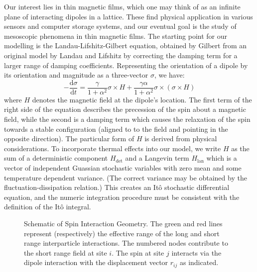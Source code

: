 \documentclass{article}
\newcommand{\deriv}[2]{\frac{\mathrm{d}#1}{\mathrm{d}#2}}
\theoremstyle{definition}
\begin{document}
Our interest lies in thin magnetic films, which one may think of as an infinite
plane of interacting dipoles in a lattice. These find physical application in
various sensors and computer storage systems, and our eventual goal is the study
of mesoscopic phenomena in thin magnetic films. The starting point for our
modelling is the Landau-Lifshitz-Gilbert equation, obtained by Gilbert from an
original model by Landau and Lifshitz by correcting the damping term for a
larger range of damping coefficients\cite{gilbertLLG}. Representing the
orientation of a dipole by its orientation and magnitude as a three-vector
$\sigma$, we have:
\begin{equation}\label{eqn:LLG}
  -\deriv{\sigma}{t} = \frac{\gamma}{1 + \alpha^2} \sigma \times H +
\frac{\gamma \alpha}{1 + \alpha^2} \sigma \times (\sigma \times H)
\end{equation}
where $H$ denotes the magnetic field at the dipole's location. The first term of
the right side of the equation describes the precession of the spin about a
magnetic field, while the second is a damping term which causes the relaxation
of the spin towards a stable configuration (aligned to to the field and pointing
in the opposite direction). The particular form of $H$ is derived from physical
considerations. To incorporate thermal effects into our model, we write $H$ as
the sum of a deterministic component $H_\text{det}$ and a Langevin term
$H_\text{lan}$ which is a vector of independent Guassian stochastic variables
with zero mean and some temperature dependent variance. (The correct variance may be
obtained by the fluctuation-dissipation relation.) This creates an Itô
stochastic differential equation, and the numeric integration procedure must be
consistent with the definition of the Itô integral.

\begin{figure}
\caption{\label{fig:lattice1} Schematic of Spin Interaction Geometry. The green
and red lines represent (respectively) the effective range of the long and short
range interparticle interactions. The numbered nodes contribute to the short
range field at site $i$. The spin at site $j$ interacts via the dipole
interaction with the displacement vector $r_{ij}$ as indicated.}
\begin{center}
\end{center}
\end{figure}
\end{document}
